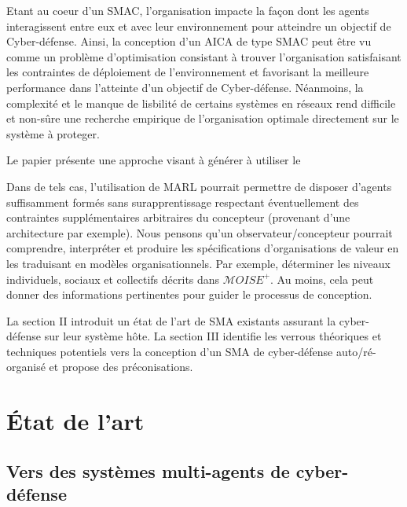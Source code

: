 \documentclass[conference]{IEEEtran}
\begin{document}
Etant au coeur d'un SMAC, l'organisation impacte la façon dont les agents interagissent entre eux et avec leur environnement pour atteindre un objectif de Cyber-défense. Ainsi, la conception d'un AICA de type SMAC peut être vu comme un problème d'optimisation consistant à trouver l'organisation satisfaisant les contraintes de déploiement de l'environnement et favorisant la meilleure performance dans l'atteinte d'un objectif de Cyber-défense.
Néanmoins, la complexité et le manque de lisbilité de certains systèmes en réseaux rend difficile et non-sûre une recherche empirique de l'organisation optimale directement sur le système à proteger.

Le papier présente une approche visant à générer à utiliser le 


Dans de tels cas, l'utilisation de MARL pourrait permettre de disposer d'agents suffisamment formés sans surapprentissage respectant éventuellement des contraintes supplémentaires arbitraires du concepteur (provenant d'une architecture par exemple). Nous pensons qu'un observateur/concepteur pourrait comprendre, interpréter et produire les spécifications d'organisations de valeur en les traduisant en modèles organisationnels. Par exemple, déterminer les niveaux individuels, sociaux et collectifs décrits dans $\mathcal{M}OISE^{+}$\cite{Hubner2002}. Au moins, cela peut donner des informations pertinentes pour guider le processus de conception.



La section II introduit un état de l'art de SMA existants assurant la cyber-défense sur leur système hôte. La section III identifie les verrous théoriques et techniques potentiels vers la conception d'un SMA de cyber-défense auto/ré-organisé et propose des préconisations.

\section{\'Etat de l'art}

\subsection{Vers des systèmes multi-agents de cyber-défense}


\end{document}
